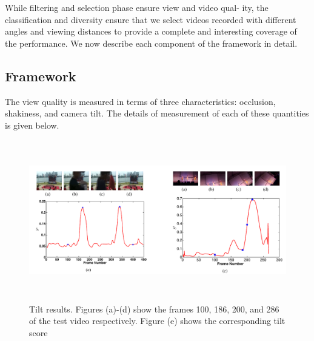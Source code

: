 \documentclass{sig-alternate}
\begin{document}
While filtering and selection phase ensure view and video qual-
ity, the classification and diversity ensure that we select videos
recorded with different angles and viewing distances to provide a
complete and interesting coverage of the performance. We now
describe each component of the framework in detail.

\subsection{Framework}

The view quality is measured in terms of three characteristics:
occlusion, shakiness, and camera tilt. The details of measurement
of each of these quantities is given below.
 \begin{figure}[h]
\includegraphics[width=\textwidth ,height = 7cm]{4}
\caption{Tilt results. Figures (a)-(d) show the frames 100, 186, 200, and 286 of the test video respectively. Figure (e) shows the corresponding tilt score}
\label{fig:figure4}
\end{figure}
\end{document}

